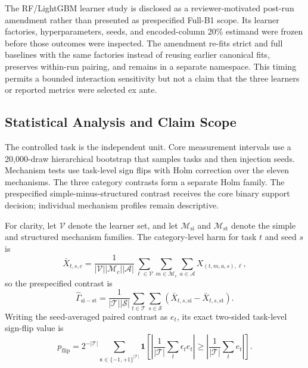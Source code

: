 \documentclass[sigconf,review]{acmart}
\begin{document}
The RF/LightGBM learner study is disclosed as a reviewer-motivated post-run
amendment rather than presented as prespecified Full-B1 scope. Its learner
factories, hyperparameters, seeds, and encoded-column 20\% estimand were frozen
before those outcomes were inspected. The amendment re-fits strict and full
baselines with the same factories instead of reusing earlier canonical fits,
preserves within-run pairing, and remains in a separate namespace. This timing
permits a bounded interaction sensitivity but not a claim that the three
learners or reported metrics were selected ex ante.

\subsection{Statistical Analysis and Claim Scope}

The controlled task is the independent unit. Core measurement intervals use a
20,000-draw hierarchical bootstrap that samples tasks and then injection seeds.
Mechanism tests use task-level sign flips with Holm correction over the eleven
mechanisms. The three category contrasts form a separate Holm family. The
prespecified simple-minus-structured contrast receives the core binary support
decision; individual mechanism profiles remain descriptive.

For clarity, let $\mathcal{V}$ denote the learner set, and let
$\mathcal{M}_{\mathrm{si}}$ and $\mathcal{M}_{\mathrm{st}}$ denote the simple
and structured mechanism families. The category-level harm for task $t$ and
seed $s$ is
\begin{equation}
 \bar X_{t,s,c}=\frac{1}{|\mathcal{V}||\mathcal{M}_c||\mathcal{A}|}
 \sum_{\ell\in\mathcal{V}}\sum_{m\in\mathcal{M}_c}
 \sum_{a\in\mathcal{A}}X_{(t,m,a,s),\ell},
 \label{eq:category-harm}
\end{equation}
so the prespecified contrast is
\begin{equation}
 \widehat{\Gamma}_{\mathrm{si-st}}
 =\frac{1}{|\mathcal{T}||\mathcal{S}|}
 \sum_{t\in\mathcal{T}}\sum_{s\in\mathcal{S}}
 \left(\bar X_{t,s,\mathrm{si}}-\bar X_{t,s,\mathrm{st}}\right).
 \label{eq:core-contrast}
\end{equation}
Writing the seed-averaged paired contrast as $e_t$, its exact two-sided
task-level sign-flip value is
\begin{equation}
 p_{\mathrm{flip}}=2^{-|\mathcal{T}|}
 \sum_{\boldsymbol{\epsilon}\in\{-1,+1\}^{|\mathcal{T}|}}
 \mathbf{1}\!\left[
 \left|\frac{1}{|\mathcal{T}|}\sum_t\epsilon_t e_t\right|
 \geq\left|\frac{1}{|\mathcal{T}|}\sum_t e_t\right|\right].
 \label{eq:sign-flip}
\end{equation}
\end{document}
